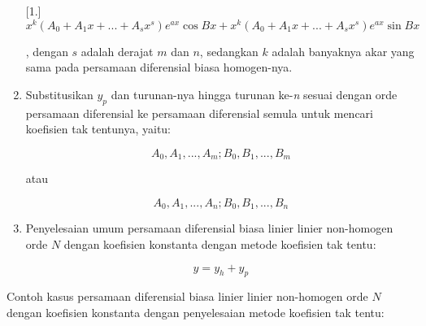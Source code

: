 \begin{enumerate} [1.]
	\begin{equation} x^{k} (A_0 + A_1 x + ... + A_s x^{s}) e^{ax} \cos Bx +  x^{k} (A_0 + A_1 x + ... + A_s x^{s}) e^{ax} \sin Bx \end{equation}

	, dengan \begin{math} s \end{math} adalah derajat \begin{math} m \end{math} dan \begin{math} n \end{math}, sedangkan \begin{math} k \end{math} adalah banyaknya akar yang sama pada persamaan diferensial biasa homogen-nya.

	\item Substitusikan \begin{math} y_p \end{math} dan turunan-nya hingga turunan ke-\textit{n} sesuai dengan orde persamaan diferensial ke persamaan diferensial semula untuk mencari koefisien tak tentunya, yaitu:
	
	\begin{equation} A_0, A_1, ... , A_m ; B_0, B_1, ..., B_m\end{equation}
	
	atau

	\begin{equation}  A_0, A_1, ... , A_n ; B_0, B_1, ..., B_n \end{equation}

	\item Penyelesaian umum persamaan diferensial biasa linier linier non-homogen orde \begin{math} N \end{math} dengan koefisien konstanta dengan metode koefisien tak tentu:

	\begin{displaymath} y = y_h + y_p \end{displaymath}

\end{enumerate}

Contoh kasus persamaan diferensial biasa linier linier non-homogen orde \begin{math} N \end{math} dengan koefisien konstanta dengan penyelesaian metode koefisien tak tentu:

